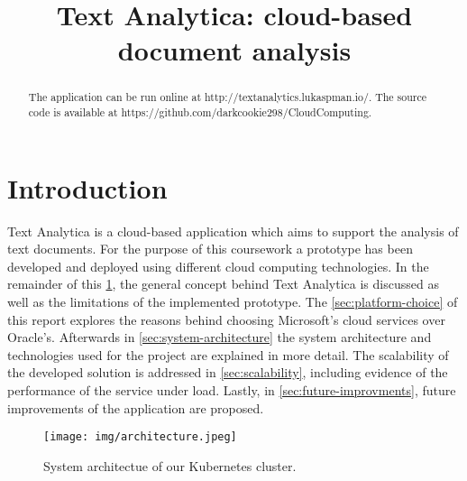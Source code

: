 \documentclass[conference]{IEEEtran}
\begin{document}
\title{Text Analytica: cloud-based document analysis\\}

\author{
\and
{}
}

\maketitle

\begin{abstract}
The application can be run online at http://textanalytics.lukaspman.io/.
The source code is available at https://github.com/darkcookie298/CloudComputing.
\end{abstract}

\section{Introduction}
\label{sec:intro}
Text Analytica is a cloud-based application which aims to support the analysis of text documents. For the purpose of this coursework a prototype has been developed and deployed using different cloud computing technologies. In the remainder of this \cref{sec:intro}, the general concept behind Text Analytica is discussed as well as the limitations of the implemented prototype. The \cref{sec:platform-choice} of this report explores the reasons behind choosing Microsoft’s cloud services over Oracle’s. Afterwards in \cref{sec:system-architecture} the system architecture and technologies used for the project are explained in more detail. The scalability of the developed solution is addressed in \cref{sec:scalability}, including evidence of the performance of the service under load. Lastly, in \cref{sec:future-improvments}, future improvements of the application are proposed.

\begin{figure*}[ht!]
\texttt{[image: img/architecture.jpeg]}
\caption{System architectue of our Kubernetes cluster.}
\label{img:architecture}
\end{figure*}
\end{document}
